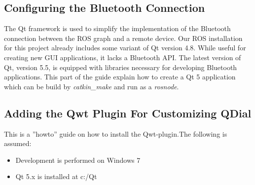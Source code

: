 \subsection{Configuring the Bluetooth Connection}

The Qt framework is used to simplify the implementation of the Bluetooth connection between the \ac{ROS} graph and a remote device. Our \ac{ROS} installation for this project already includes some variant of Qt version 4.8. While useful for creating new \ac{GUI} applications, it lacks a Bluetooth API. The latest version of Qt, version 5.5, is equipped with libraries necessary for developing Bluetooth applications. This part of the guide explain how to create a Qt 5 application which can be build by \textit{catkin\_make} and run as a \textit{rosnode}.

\subsection{Adding the Qwt Plugin For Customizing QDial}

This is a ''howto'' guide on how to install the Qwt-plugin.The following is assumed:

\begin{itemize}
	\item Development is performed on Windows 7
	\item Qt 5.x is installed at c:/Qt
\end{itemize}
